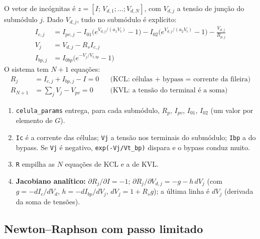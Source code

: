 O vetor de inc\'ognitas \'e $z=[I;\,V_{d,1};\dots;V_{d,N}]$, com $V_{d,j}$ a tens\~ao de jun\c{c}\~ao
do subm\'odulo $j$. Dado $V_{d,j}$, tudo no subm\'odulo \'e expl\'icito:
\begin{align}
I_{c,j}&=I_{pv,j}-I_{01}\big(e^{V_{d,j}/(a_1V_t)}-1\big)-I_{02}\big(e^{V_{d,j}/(a_2V_t)}-1\big)-\frac{V_{d,j}}{R_{p,j}}\\
V_j&=V_{d,j}-R_sI_{c,j}\\
I_{bp,j}&=I_{0bp}\big(e^{-V_j/V_{t,bp}}-1\big)
\end{align}
O sistema tem $N+1$ equa\c{c}\~oes:
\begin{align}
R_j&=I_{c,j}+I_{bp,j}-I=0 &&\text{(KCL: c\'elulas + bypass = corrente da fileira)}\\
R_{N+1}&=\textstyle\sum_jV_j-V_{pv}=0 &&\text{(KVL: a tens\~ao do terminal \'e a soma)}
\end{align}


\begin{logica}
\begin{enumerate}
\item \texttt{celula\_params} entrega, para cada subm\'odulo, $R_p$, $I_{pv}$, $I_{01}$, $I_{02}$ (um valor por
 elemento de $G$).
\item \texttt{Ic} \'e a corrente das c\'elulas; \texttt{Vj} a tens\~ao nos terminais do subm\'odulo;
 \texttt{Ibp} a do bypass. Se \texttt{Vj} \'e negativo, \texttt{exp(-Vj/Vt\_bp)} dispara e o bypass
 conduz muito.
\item \texttt{R} empilha as $N$ equa\c{c}\~oes de KCL e a de KVL.
\item \textbf{Jacobiano anal\'itico:} $\partial R_j/\partial I=-1$; $\partial R_j/\partial V_{d,j}=-g-h\,dV_j$
 (com $g=-dI_c/dV_d$, $h=-dI_{bp}/dV_j$, $dV_j=1+R_sg$); a \'ultima linha \'e $dV_j$ (derivada da soma de tens\~oes).
\end{enumerate}
\end{logica}

\subsection{Newton--Raphson com passo limitado}


